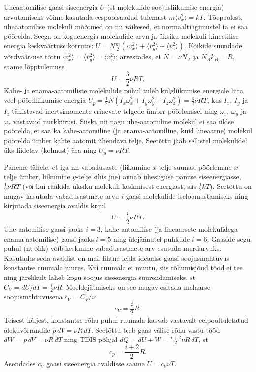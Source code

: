 \documentclass[a4paper,11pt,twocolumn]{article}
\begin{document}
Üheaatomilise gaasi siseenergia \( U \) (st molekulide soojusliikumise energia) arvutamiseks võime kasutada eespoolsaadud tulemust \( m\langle v^2_x\rangle = kT \). Tõepoolest, üheaatomilise molekuli mõõtmed on nii väikesed, et normaaltingimustel ta ei saa pöörelda. Seega on koguenergia molekulide arvu ja üksiku molekuli kineetilise energia keskväärtuse korrutis: \( U=N\frac{m}{2} (\langle v^2_x\rangle + \langle v^2_y\rangle + \langle v^2_z\rangle).\) Kõikide suundade võrdväärsuse tõttu \( \langle v^2_x\rangle = \langle v^2_y\rangle = \langle v^2_z\rangle \); arvestades, et \( N=\nu N_A \) ja \( N_A k_B=R \), saame lõpptulemuse
\[ U=\frac{3}{2} \nu RT.\]
Kahe- ja enama-aatomiliste molekulide puhul tuleb kulgliikumise energiale liita veel pöördliikumise energia \( U_p =\frac{1}{2} N(I_x\omega_x^2 + I_y\omega_y^2 + I_z\omega_z^2)=\frac{3}{2} \nu RT \), kus \( I_x \), \( I_y \) ja \( I_z \) tähistavad inertsimomente erinevate telgede ümber pöörlemisel ning \( \omega_x \), \( \omega_y \) ja \( \omega_z \) vastavaid nurkkiirusi. Siiski, nii nagu ühe-aatomiline molekul ei saa üldse pöörelda, ei saa ka kahe-aatomiline (ja enama-aatomiline, kuid lineaarne) molekul pöörelda ümber kahte aatomit ühendava telje. Seetõttu jääb sellistel molekulidel üks liidetav (kolmest) ära ning \( U_p=\nu RT .\) 

Paneme tähele, et iga nn vabadusaste (liikumine \( x \)-telje suunas, pöörlemine \( x \)-telje ümber, liikumine \( y \)-telje sihis jne) annab ühesuguse panuse siseenergiasse, \( \frac{1}{2}\nu RT \) (või kui rääkida üksiku molekuli keskmisest energiast, siis \( \frac{1}{2}kT \)). Seetõttu on mugav kasutada vabadusastmete arvu \( i \) gaasi molekulide iseloomustamiseks ning kirjutada siseenergia avaldis kujul
\[ U=\frac{i}{2} \nu RT.\]
Ühe-aatomilise gaasi jaoks \( i = 3 \), kahe-aatomilise (ja lineaarsete molekulidega enama-aatomilise) gaasi jaoks \( i = 5 \) ning ülejäänutel puhkude \( i = 6 \). Gaaside segu puhul (nt õhk) võib keskmine vabadusastmete arv osutuda murdarvuks. Kasutades seda avaldist on meil lihtne leida ideaalse gaasi soojusmahtuvus konstantse ruumala juures. Kui ruumala ei muutu, siis rõhumisjõud tööd ei tee ning järelikult läheb kogu soojus siseenergia suurendamiseks, st \( C_V = dU/dT = \frac{i}{2} \nu R \). Meeldejätmiseks on see mugav esitada molaarse soojusmahtuvusena \( c_V = C_V /\nu \):
\[ c_V = \frac{i}{2} R. \]
Teisest küljest, konstantse rõhu puhul ruumala kasvab vastavalt eelpooltuletatud olekuvõrrandile \( p\, dV = νR\, dT \). Seetõttu teeb gaas välise rõhu vastu tööd \( dW = p\, dV = \nu R\, dT \) ning TDIS põhjal \( dQ = dU + W = \frac{i+2}{2} \nu R\, dT \), st
\[ c_p=\frac{i+2}{2}R.\]
Asendades \( c_V \) gaasi siseenergia avaldisse saame \( U=c_V \nu T \).
\end{document}

